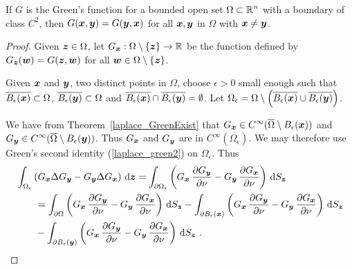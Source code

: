 \begin{prop} \label{GxyGyx}
If $G$ is the Green's function for a bounded open set
$\displaystyle \Omega \subset \mathbb{R}^n$
with a boundary of class $\displaystyle C^2$, then
$G({\bm{x}},{\bm{y}}) = G({\bm{y}},{\bm{x}})$
for all ${\bm{x}},{\bm{y}}$ in $\Omega$ with ${\bm{x}}\neq {\bm{y}}$.
\end{prop}

\begin{proof}
Given ${\bm{z}} \in \Omega$, let
$G_{{\bm{x}}}:\Omega \setminus \{{\bm{z}}\} \to \mathbb{R}$
be the function defined by $G_{{\bm{z}}}({\bm{w}}) = G({\bm{z}},{\bm{w}})$
for all ${\bm{w}} \in \Omega \setminus \{{\bm{z}}\}$.

Given ${\bm{x}}$ and ${\bm{y}}$, two distinct points in $\Omega$,
choose $\epsilon >0$ small enough such that
$\overline{B_{\epsilon}({\bm{x}})} \subset \Omega$,
$\overline{B_{\epsilon}({\bm{y}})} \subset \Omega$ and
$\overline{B_{\epsilon}({\bm{x}})} \cap
\overline{B_{\epsilon}({\bm{y}})} = \emptyset$.
Let $\Omega_\epsilon = \Omega \setminus
\left(\overline{B_{\epsilon}({\bm{x}})} \cup
\overline{B_{\epsilon}({\bm{y}})} \right)$.

We have from Theorem~\ref{laplace_GreenExist} that
$\displaystyle G_{{\bm{x}}} \in
C^\infty(\overline{\Omega}\setminus B_{\epsilon}({\bm{x}}))$ and
$\displaystyle G_{{\bm{y}}} \in
C^\infty(\overline{\Omega}\setminus B_{\epsilon}({\bm{y}}))$.
Thus $G_{{\bm{x}}}$ and $G_{{\bm{y}}}$ are in
$\displaystyle C^\infty(\overline{\Omega_{\epsilon}})$.  We may therefore use
Green's second identity (\ref{laplace_green2}) on $\Omega_{\epsilon}$.
Thus
\begin{equation} \label{laplace_GequG}
\begin{split}
&\int_{\Omega_{\epsilon}} \left( G_{{\bm{x}}} \Delta G_{{\bm{y}}} - G_{{\bm{y}}}
\Delta G_{{\bm{x}}} \right) \,\mathrm{d}{{\bm{z}}}
= \int_{\partial \Omega_{\epsilon}} \left( G_{{\bm{x}}}\,\frac{\partial{G_{{\bm{y}}}}}{\partial \nu} 
- G_{{\bm{y}}}\,\frac{\partial{G_{{\bm{x}}}}}{\partial \nu} \right) \,\mathrm{d}{S}_{{\bm{z}}} \\
& \qquad = \int_{\partial \Omega} \left( G_{{\bm{x}}}\,\frac{\partial{G_{{\bm{y}}}}}{\partial \nu} 
- G_{{\bm{y}}}\,\frac{\partial{G_{{\bm{x}}}}}{\partial \nu} \right) \,\mathrm{d}{S}_{{\bm{z}}}
- \int_{\partial B_{\epsilon}({\bm{x}})}
\left( G_{{\bm{x}}}\,\frac{\partial{G_{{\bm{y}}}}}{\partial \nu} 
- G_{{\bm{y}}}\,\frac{\partial{G_{{\bm{x}}}}}{\partial \nu} \right) \,\mathrm{d}{S}_{{\bm{z}}} \\
& \qquad - \int_{\partial B_{\epsilon}({\bm{y}})}
\left( G_{{\bm{x}}}\,\frac{\partial{G_{{\bm{y}}}}}{\partial \nu} 
- G_{{\bm{y}}}\,\frac{\partial{G_{{\bm{x}}}}}{\partial \nu} \right) \,\mathrm{d}{S}_{{\bm{z}}} \ .
\end{split}
\end{equation}


\end{proof}
